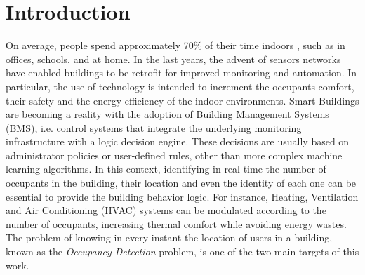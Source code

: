 %
%
\cleardoublepage
%
%
%
\chapter{Introduction}
%
%
\label{cap:intro}
%
%
On average, people spend approximately 70\% of their time indoors \cite{Roulet2001}, such as in offices, schools, and at home.
In the last years, the advent of sensors networks have enabled buildings to be retrofit for improved monitoring and automation.
In particular, the use of technology is intended to increment the occupants comfort, their safety and the energy efficiency of the indoor environments.
Smart Buildings are becoming a reality with the adoption of Building Management Systems (BMS), i.e. control systems that integrate the underlying monitoring infrastructure with a logic decision engine. These decisions are usually based on administrator policies or user-defined rules, other than more complex machine learning algorithms.
In this context, identifying in real-time the number of occupants in the building, their location and even the identity of each one can be essential to provide the building behavior logic. For instance, Heating, Ventilation and Air Conditioning (HVAC) systems can be modulated according to the number of occupants, increasing thermal comfort while avoiding energy wastes.
The problem of knowing in every instant the location of users in a building, known as the \emph{Occupancy Detection} problem, is one of the two main targets of this work.

